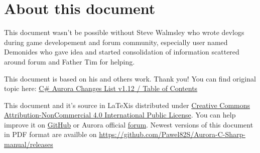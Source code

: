 \documentclass[../../Aurora C# unofficial manual.tex]{subfiles}
\begin{document}
	\section{About this document}
	This document wasn't be possible without Steve Walmsley who wrote devlogs during game
	developement and forum community, especially user named Demonides who gave idea and
	started consolidation of information scattered around forum and Father Tim for helping.
	
	This document is based on his and others work. Thank you! You can find original topic
	here: \href{http://aurora2.pentarch.org/index.php?topic=10666.0}{C\# Aurora Changes List v1.12 / Table of Contents}
	
	This document and it's source in \LaTeX\space is distributed under \href{https://creativecommons.org/licenses/by-nc/4.0/}{Creative Commons Attribution-NonCommercial 4.0 International Public License}. You can help improve it
	on \href{https://github.com/Pawel82S/Aurora-C-Sharp-manual}{GitHub} or Aurora official \href{http://aurora2.pentarch.org/}{forum}. Newest versions of this document in PDF format are availble on \href{https://github.com/Pawel82S/Aurora-C-Sharp-manual/releases}{https://github.com/Pawel82S/Aurora-C-Sharp-manual/releases}
\end{document}
